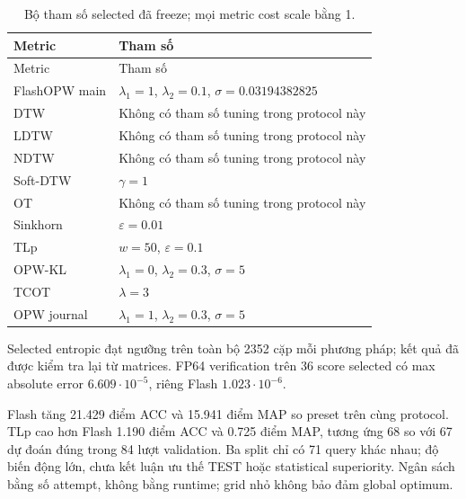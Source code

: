 \documentclass[11pt,a4paper]{article}
\begin{document}
\begingroup\small
\begin{longtable}{@{}lp{.68\linewidth}@{}}
\caption{Bộ tham số selected đã freeze; mọi metric cost scale bằng 1.}\label{tab:selected}\\
\toprule
Metric & Tham số \\
\midrule
\endfirsthead
\toprule
Metric & Tham số \\
\midrule
\endhead
\bottomrule
\endfoot
FlashOPW main & $\lambda_1=1$, $\lambda_2=0.1$, $\sigma=0.03194382825$ \\
DTW & Không có tham số tuning trong protocol này \\
LDTW & Không có tham số tuning trong protocol này \\
NDTW & Không có tham số tuning trong protocol này \\
Soft-DTW & $\gamma=1$ \\
OT & Không có tham số tuning trong protocol này \\
Sinkhorn & $\varepsilon=0.01$ \\
TLp & $w=50$, $\varepsilon=0.1$ \\
OPW-KL & $\lambda_1=0$, $\lambda_2=0.3$, $\sigma=5$ \\
TCOT & $\lambda=3$ \\
OPW journal & $\lambda_1=1$, $\lambda_2=0.3$, $\sigma=5$ \\
\end{longtable}
\endgroup
Selected entropic đạt ngưỡng trên toàn bộ 2352 cặp mỗi phương pháp;
kết quả đã được kiểm tra lại từ matrices. FP64 verification trên 36 score
selected có max absolute error $6.609\cdot10^{-5}$, riêng Flash
$1.023\cdot10^{-6}$.

Flash tăng 21.429 điểm ACC và 15.941 điểm MAP so preset trên cùng protocol.
TLp cao hơn Flash 1.190 điểm ACC và 0.725 điểm MAP, tương ứng 68 so với
67 dự đoán đúng trong 84 lượt validation. Ba split chỉ có 71 query khác nhau;
độ biến động lớn, chưa kết luận ưu thế TEST hoặc statistical superiority.
Ngân sách bằng số attempt, không bằng runtime; grid nhỏ không bảo đảm global optimum.
\end{document}
